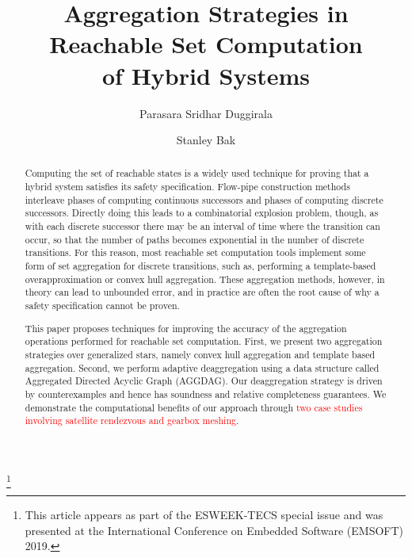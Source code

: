 \documentclass[acmsmall]{acmart}
\newcommand{\new}[1]{\textcolor{red}{#1}}
\newcommand{\new}[1]{#1}
\newcommand\blfootnote[1]{%
  \begingroup
  \renewcommand\thefootnote{}\footnote{#1}%
  \addtocounter{footnote}{-1}%
  \endgroup
}
\begin{document}
\blfootnote{This article appears as part of the ESWEEK-TECS special issue and was presented at the International Conference on Embedded Software (EMSOFT) 2019.}

%
\title{Aggregation Strategies in Reachable Set Computation\\ of Hybrid Systems}

%


\author{Parasara Sridhar Duggirala}

\author{Stanley Bak}




\begin{abstract}
  Computing the set of reachable states is a widely used technique for proving that a hybrid system satisfies its safety specification.
  Flow-pipe construction methods interleave phases of computing continuous successors and phases of computing discrete successors.
  Directly doing this leads to a combinatorial explosion problem, though, as with each discrete successor there may be an interval of time
  where the transition can occur, so that the number of paths becomes exponential in the number of discrete transitions.
  For this reason, most reachable set computation tools implement some form of set aggregation for discrete transitions, such as, performing a
  template-based overapproximation or convex hull aggregation.
  These aggregation methods, however, in theory can lead to unbounded error, and in practice are often
  the root cause of why a safety specification cannot be proven.

  This paper proposes techniques for improving the accuracy of the aggregation operations performed for reachable set computation.
  First, we present two aggregation strategies over generalized stars, namely convex hull aggregation and template based aggregation.
  Second, we perform adaptive deaggregation using a data structure called Aggregated Directed Acyclic Graph (AGGDAG).
  Our deaggregation strategy is driven by counterexamples and hence has soundness and relative completeness guarantees.
  We demonstrate the computational benefits of our approach through \new{two case studies involving satellite rendezvous and gearbox meshing}.
\end{abstract}
\end{document}
